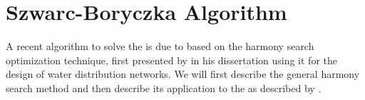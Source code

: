 \section{Szwarc-Boryczka Algorithm}
\label{sec:04:szwarc}

A recent algorithm to solve the \op is due to \citeauthor{szwarc_novel_2022} \cite{szwarc_novel_2022} based on the harmony search optimization technique, 
first presented by \citeauthor{geem_optimal_2000} in his dissertation using it for the design of water distribution networks. \cite{geem_optimal_2000}
We will first describe the general harmony search method and then describe its application to the \op as described by \citeauthor{szwarc_novel_2022}.





